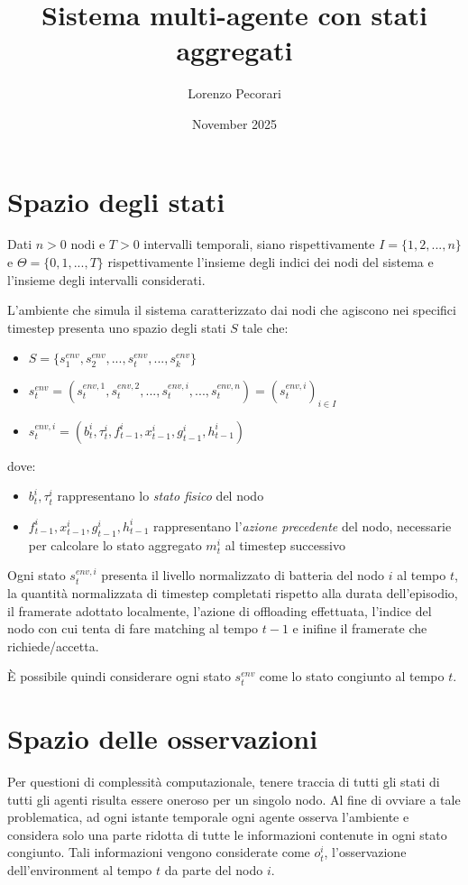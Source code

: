 \documentclass{article}
\title{Sistema multi-agente con stati aggregati}
\author{Lorenzo Pecorari}
\date{November 2025}
\begin{document}
\maketitle

\section{Spazio degli stati}
Dati $n > 0$ nodi e $T > 0$ intervalli temporali, siano rispettivamente $I = \{1, 2, ..., n\}$ e $\Theta = \{0, 1, ..., T\}$ rispettivamente  l'insieme degli indici dei nodi del sistema e l'insieme degli intervalli considerati.  

L'ambiente che simula il sistema caratterizzato dai nodi che agiscono nei specifici timestep presenta uno spazio degli stati $S$ tale che:
\begin{itemize}
    \item $S = \{s_1^{env}, s_2^{env}, ..., s_t^{env}, ..., s_k^{env}\}$
    \item $s_t^{env} = (s_t^{env,1}, s_t^{env, 2}, ..., s_t^{env, i}, ..., s_t^{env, n}) = (s_t^{env, i})_{i\in I}$
    \item $s_t^{env, i} = (b_t^i, \tau_t^i, f_{t-1}^i, x_{t-1}^i, g_{t-1}^i, h_{t-1}^i)$
\end{itemize}

dove:
\begin{itemize}
    \item $b^i_t, \tau^i_t$ rappresentano lo \textit{stato fisico} del nodo
    \item $f^i_{t-1}, x^i_{t-1}, g^i_{t-1}, h^i_{t-1}$ rappresentano 
          l'\textit{azione precedente} del nodo, necessarie per calcolare 
          lo stato aggregato $m^i_t$ al timestep successivo
\end{itemize}

Ogni stato $s_t^{env, i}$ presenta il livello normalizzato di batteria del nodo $i$ al tempo $t$, la quantità normalizzata di timestep completati rispetto alla durata dell'episodio, il framerate adottato localmente, l'azione di offloading effettuata, l'indice del nodo con cui tenta di fare matching al tempo $t-1$ e inifine il framerate che richiede/accetta.

È possibile quindi considerare ogni stato $s_t^{env}$ come lo stato congiunto al tempo $t$.

\section{Spazio delle osservazioni}
Per questioni di complessità computazionale, tenere traccia di tutti gli stati di tutti gli agenti risulta essere oneroso per un singolo nodo. Al fine di ovviare a tale problematica, ad ogni istante temporale ogni agente osserva l'ambiente e considera solo una parte ridotta di tutte le informazioni contenute in ogni stato congiunto. Tali informazioni vengono considerate come $o_t^i$, l'osservazione dell'environment al tempo $t$ da parte del nodo $i$.\\
\end{document}
